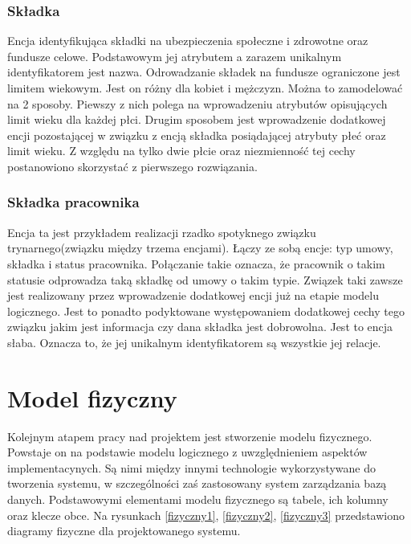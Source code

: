 \subsubsection{Składka}
Encja identyfikująca składki na ubezpieczenia społeczne i zdrowotne oraz fundusze celowe. Podstawowym jej atrybutem a zarazem unikalnym identyfikatorem jest nazwa. Odrowadzanie składek na fundusze ograniczone jest limitem wiekowym. Jest on różny dla kobiet i mężczyzn. Można to zamodelować na 2 sposoby. Piewszy z nich polega na wprowadzeniu atrybutów opisujących limit wieku dla każdej płci. Drugim sposobem jest wprowadzenie dodatkowej encji pozostającej w związku z encją składka posiądającej atrybuty płeć oraz limit wieku. Z względu na tylko dwie płcie oraz niezmienność tej cechy postanowiono skorzystać z pierwszego rozwiązania.

\subsubsection{Składka pracownika}
Encja ta jest przykładem realizacji rzadko spotyknego związku trynarnego(związku między trzema encjami).  Łączy ze sobą encje: typ umowy, składka i status pracownika. Połączanie takie oznacza, że pracownik o takim statusie odprowadza taką składkę od umowy o takim typie. Związek taki zawsze jest realizowany przez wprowadzenie dodatkowej encji już na etapie modelu logicznego.  Jest to ponadto podyktowane występowaniem dodatkowej cechy tego związku jakim jest informacja czy dana składka jest dobrowolna. Jest to encja słaba. Oznacza to, że jej unikalnym identyfikatorem są wszystkie jej relacje.


\section[Model fizyczny][Model fizyczny]{Model fizyczny}
Kolejnym atapem pracy nad projektem jest stworzenie modelu fizycznego. Powstaje on na podstawie modelu logicznego z uwzględnieniem aspektów implementacynych. Są nimi między innymi technologie wykorzystywane do tworzenia systemu, w szczególności zaś zastosowany system zarządzania bazą danych. Podstawowymi elementami modelu fizycznego są tabele, ich kolumny oraz klecze obce. Na rysunkach \ref{fizyczny1}, \ref{fizyczny2}, \ref{fizyczny3} przedstawiono diagramy fizyczne dla projektowanego systemu.



